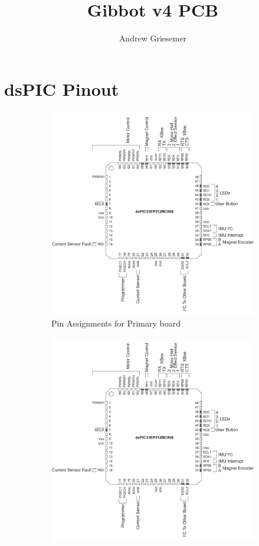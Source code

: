 \documentclass{article}
\begin{document}
\title{Gibbot v4 PCB}
\author{Andrew Griesemer}
\maketitle
\section{dsPIC Pinout}
\begin{figure}[h!]
	\centering
	\begin{subfigure}{0.4\textwidth}
		\includegraphics[width=\textwidth, page=1]{breakout}
		\caption{Pin Assignments for Primary board}
		\label{pinout1}
	\end{subfigure}
	\begin{subfigure}{0.4\textwidth}
		\includegraphics[width=\textwidth, page=2]{breakout}

\end{subfigure}
\end{figure}
\end{document}
